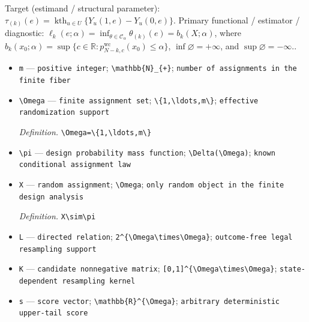 \documentclass{article}
\begin{document}
Target (estimand / structural parameter): \(\tau_{(k)}(e)=\operatorname{kth}_{u\in U}\{Y_u(1,e)-Y_u(0,e)\}\).
Primary functional / estimator / diagnostic: \(\ell_k(e;\alpha)=\inf_{\theta\in\mathcal C_{\alpha}}\theta_{(k)}(e)=b_k(X;\alpha)\), where \(b_k(x_0;\alpha)=\sup\{c\in\mathbb R:p^{\mathrm{wc}}_{N-k,c}(x_0)\leq\alpha\}\), \(\inf\varnothing=+\infty\), and \(\sup\varnothing=-\infty\)..
\begin{itemize}
  \item \texttt{m} --- \texttt{positive integer}; \texttt{\textbackslash{}\allowbreak{}mathbb\{N\}\allowbreak{}\_\allowbreak{}\{+\allowbreak{}\}\allowbreak{}}; \texttt{number of assignments in the finite fiber}
  \item \texttt{\textbackslash{}\allowbreak{}Omega} --- \texttt{finite assignment set}; \texttt{\textbackslash{}\allowbreak{}\{1,\allowbreak{}\textbackslash{}\allowbreak{}ldots,\allowbreak{}m\textbackslash{}\allowbreak{}\}\allowbreak{}}; \texttt{effective randomization support}
  \par\smallskip\noindent\emph{Definition.} \texttt{\textbackslash{}\allowbreak{}Omega=\allowbreak{}\textbackslash{}\allowbreak{}\{1,\allowbreak{}\textbackslash{}\allowbreak{}ldots,\allowbreak{}m\textbackslash{}\allowbreak{}\}\allowbreak{}}
  \item \texttt{\textbackslash{}\allowbreak{}pi} --- \texttt{design probability mass function}; \texttt{\textbackslash{}\allowbreak{}Delta(\textbackslash{}\allowbreak{}Omega)}; \texttt{known conditional assignment law}
  \item \texttt{X} --- \texttt{random assignment}; \texttt{\textbackslash{}\allowbreak{}Omega}; \texttt{only random object in the finite design analysis}
  \par\smallskip\noindent\emph{Definition.} \texttt{X\textbackslash{}\allowbreak{}sim\textbackslash{}\allowbreak{}pi}
  \item \texttt{L} --- \texttt{directed relation}; \texttt{2\textasciicircum{}\{\textbackslash{}\allowbreak{}Omega\textbackslash{}\allowbreak{}times\textbackslash{}\allowbreak{}Omega\}\allowbreak{}}; \texttt{outcome-\allowbreak{}free legal resampling support}
  \item \texttt{K} --- \texttt{candidate nonnegative matrix}; \texttt{[0,\allowbreak{}1]\textasciicircum{}\{\textbackslash{}\allowbreak{}Omega\textbackslash{}\allowbreak{}times\textbackslash{}\allowbreak{}Omega\}\allowbreak{}}; \texttt{state-\allowbreak{}dependent resampling kernel}
  \item \texttt{s} --- \texttt{score vector}; \texttt{\textbackslash{}\allowbreak{}mathbb\{R\}\allowbreak{}\textasciicircum{}\{\textbackslash{}\allowbreak{}Omega\}\allowbreak{}}; \texttt{arbitrary deterministic upper-\allowbreak{}tail score}

\end{itemize}
\end{document}
